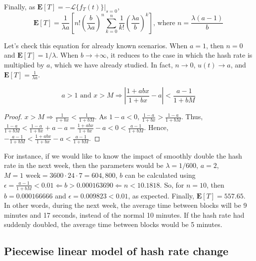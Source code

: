 Finally, as $\mathbf{E}[T] = -\mathcal{L}\{f_T(t)\}|_{s=0}$,
$$\mathbf{E}[T] = \frac{1}{\lambda a} \left[ n! \left(\frac{b}{\lambda a}\right)^n \sum_{k=0}^n \frac{1}{k!} \left( \frac{\lambda a}{b} \right)^{k} \right] \text{, where $n = \frac{\lambda(a-1)}{b}$}$$

Let's check this equation for already known scenarios. When $a=1$, then $n=0$ and $\mathbf{E}[T] = 1/\lambda$. When $b \rightarrow +\infty$, it reduces to the case in which the hash rate is multiplied by $a$, which we have already studied. In fact, $n \rightarrow 0$, $u(t) \rightarrow a$, and $\mathbf{E}[T] = \frac{1}{\lambda a}$.

\begin{theorem}
	$$a > 1 \text{ and } x > M \Rightarrow \left| \frac{1+abx}{1+bx} - a \right| < \frac{a-1}{1+bM}$$
\end{theorem}
\begin{proof}
$x > M \Rightarrow \frac{1}{1+bx} < \frac{1}{1+bM}$. As $1-a<0$, $\frac{1-a}{1+bx} > \frac{1-a}{1+bM}$. Thus, $\frac{1-a}{1+bM} < \frac{1-a}{1+bx} + a - a = \frac{1+abx}{1+bx} - a < 0 < \frac{a-1}{1+bM}$. Hence, $-\frac{a-1}{1+bM} < \frac{1+abx}{1+bx} - a < \frac{a-1}{1+bM}$.
\end{proof}

For instance, if we would like to know the impact of smoothly double the hash rate in the next week, then the parameters would be $\lambda = 1/600$, $a=2$, $M=1\text{ week}=3600\cdot24\cdot7 = 604,800$, $b$ can be calculated using $\epsilon = \frac{a-1}{1+bM} < 0.01 \Leftarrow b > 0.000163690 \Leftarrow n < 10.1818$. So, for $n=10$, then $b=0.000166666$ and $\epsilon = 0.009823 < 0.01$, as expected. Finally, $\mathbf{E}[T] = 557.65$. In other words, during the next week, the average time between blocks will be 9 minutes and 17 seconds, instead of the normal 10 minutes. If the hash rate had suddenly doubled, the average time between blocks would be 5 minutes.





\subsection{Piecewise linear model of hash rate change}

